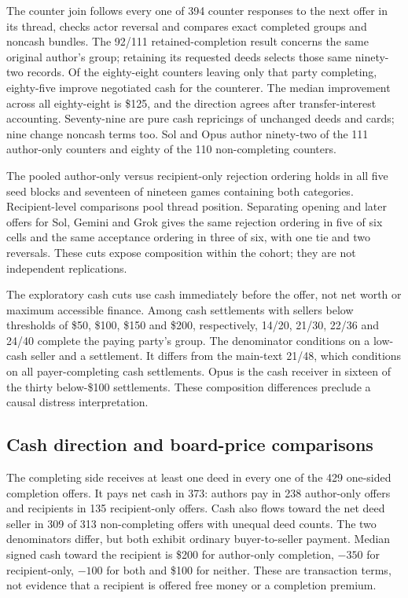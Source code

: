 The counter join follows every one of 394 counter responses to the next offer in its thread, checks actor reversal and compares exact completed groups and noncash bundles. The 92/111 retained-completion result concerns the same original author's group; retaining its requested deeds selects those same ninety-two records. Of the eighty-eight counters leaving only that party completing, eighty-five improve negotiated cash for the counterer. The median improvement across all eighty-eight is \$125, and the direction agrees after transfer-interest accounting. Seventy-nine are pure cash repricings of unchanged deeds and cards; nine change noncash terms too. Sol and Opus author ninety-two of the 111 author-only counters and eighty of the 110 non-completing counters.

The pooled author-only versus recipient-only rejection ordering holds in all five seed blocks and seventeen of nineteen games containing both categories. Recipient-level comparisons pool thread position. Separating opening and later offers for Sol, Gemini and Grok gives the same rejection ordering in five of six cells and the same acceptance ordering in three of six, with one tie and two reversals. These cuts expose composition within the cohort; they are not independent replications.

The exploratory cash cuts use cash immediately before the offer, not net worth or maximum accessible finance. Among cash settlements with sellers below thresholds of \$50, \$100, \$150 and \$200, respectively, 14/20, 21/30, 22/36 and 24/40 complete the paying party's group. The denominator conditions on a low-cash seller and a settlement. It differs from the main-text 21/48, which conditions on all payer-completing cash settlements. Opus is the cash receiver in sixteen of the thirty below-\$100 settlements. These composition differences preclude a causal distress interpretation.

\subsection{Cash direction and board-price comparisons}
\label{app:prices}

The completing side receives at least one deed in every one of the 429 one-sided completion offers. It pays net cash in 373: authors pay in 238 author-only offers and recipients in 135 recipient-only offers. Cash also flows toward the net deed seller in 309 of 313 non-completing offers with unequal deed counts. The two denominators differ, but both exhibit ordinary buyer-to-seller payment. Median signed cash toward the recipient is \$200 for author-only completion, $-350$ for recipient-only, $-100$ for both and \$100 for neither. These are transaction terms, not evidence that a recipient is offered free money or a completion premium.

